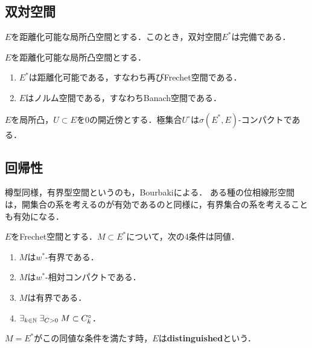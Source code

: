 \documentclass[uplatex,dvipdfmx]{jsreport}
\begin{document}
\subsection{双対空間}

\begin{theorem}
    $E$を距離化可能な局所凸空間とする．このとき，双対空間$E^*$は完備である．
\end{theorem}

\begin{corollary}
    $E$を距離化可能な局所凸空間とする．
    \begin{enumerate}
        \item $E^*$は距離化可能である，すなわち再びFrechet空間である．
        \item $E$はノルム空間である，すなわちBanach空間である．
    \end{enumerate}
\end{corollary}

\begin{theorem}
    $E$を局所凸，$U\subset E$を$0$の開近傍とする．極集合$U^\circ$は$\sigma(E^*,E)$-コンパクトである．
\end{theorem}

\subsection{回帰性}

\begin{tcolorbox}[colframe=ForestGreen, colback=ForestGreen!10!white,breakable,colbacktitle=ForestGreen!40!white,coltitle=black,fonttitle=\bfseries\sffamily,
title=]
    樽型同様，有界型空間というのも，Bourbakiによる．
    ある種の位相線形空間は，開集合の系を考えるのが有効であるのと同様に，有界集合の系を考えることも有効になる．
\end{tcolorbox}

\begin{theorem}
    $E$をFrechet空間とする．$M\subset E^*$について，次の4条件は同値．
    \begin{enumerate}
        \item $M$は$w^*$-有界である．
        \item $M$は$w^*$-相対コンパクトである．
        \item $M$は有界である．
        \item $\exists_{k\in\mathbb{N}}\;\exists_{C>0}\;M\subset C^\circ_k$．
    \end{enumerate}
    $M=E^*$がこの同値な条件を満たす時，$E$は\textbf{distinguished}という．
\end{theorem}
\end{document}
